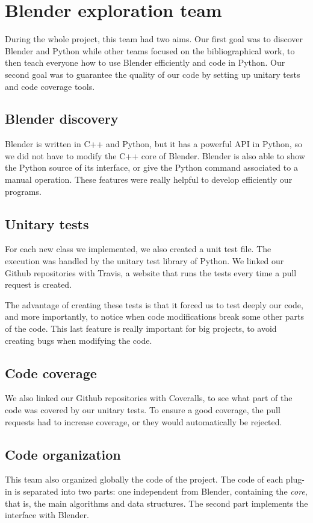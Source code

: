 \section{Blender exploration team}

During the whole project, this team had two aims. Our first goal was
to discover Blender and Python while other teams focused on the
bibliographical work, to then teach everyone how to use Blender
efficiently and code in Python. Our second goal was to guarantee the
quality of our code by setting up unitary tests and code coverage
tools.

\subsection{Blender discovery}

Blender is written in C++ and Python, but it has a powerful API in
Python, so we did not have to modify the C++ core of Blender. Blender
is also able to show the Python source of its interface, or give the
Python command associated to a manual operation. These features were
really helpful to develop efficiently our programs.


\subsection{Unitary tests}

For each new class we implemented, we also created a unit test
file. The execution was handled by the unitary test library of
Python. We linked our Github repositories with Travis, a website
that runs the tests every time a pull request is created.

The advantage of creating these tests is that it forced us to test
deeply our code, and more importantly, to notice when code modifications
break some other parts of the code. This last feature is really
important for big projects, to avoid creating bugs when modifying the
code.

\subsection{Code coverage}

We also linked our Github repositories with Coveralls, to see what
part of the code was covered by our unitary tests. To ensure a good
coverage, the pull requests had to increase coverage, or they would
automatically be rejected.

\subsection{Code organization}
This team also organized globally the code of the project. The code of
each plug-in is separated into two parts: one independent from
Blender, containing the \textit{core}, that is, the main algorithms
and data structures. The second part implements the interface with
Blender.


